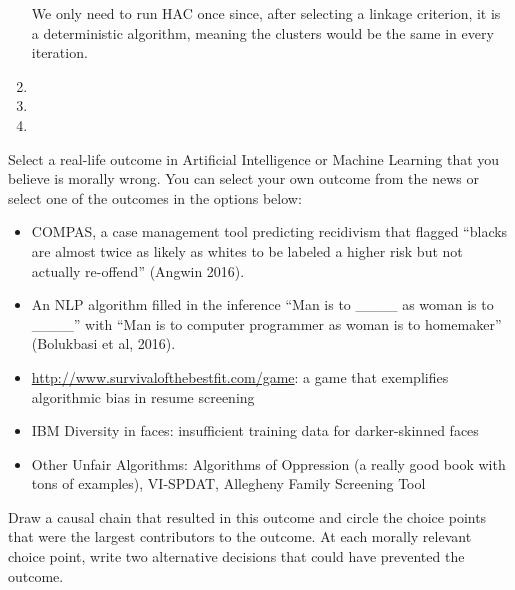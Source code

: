 \documentclass[submit]{harvardml}
\begin{document}
\begin{enumerate}
	We only need to run HAC once since, after selecting a linkage criterion, it is a deterministic algorithm, meaning the clusters would be the same in every iteration.

	\item 
	\item
	\item
\end{enumerate}

\newpage

\begin{problem}

Select a real-life outcome in Artificial Intelligence or Machine Learning 
that you believe is morally wrong. You can select your own outcome from 
the news or select one of the outcomes in the options below:

\begin{itemize}
    \item COMPAS, a case management tool predicting recidivism that 
        flagged “blacks are almost twice as likely as whites to be 
        labeled a higher risk but not actually re-offend” (Angwin 
        2016).
        
    \item An NLP algorithm filled in the inference “Man is to 
        \_\_\_\_ as woman is to \_\_\_\_” with “Man is 
        to computer programmer as woman is to homemaker” (Bolukbasi 
        et al, 2016).
        
    \item \url{http://www.survivalofthebestfit.com/game}: a game that 
        exemplifies algorithmic bias in resume screening
        
    \item IBM Diversity in faces: insufficient training data for 
        darker-skinned faces
        
    \item Other Unfair Algorithms: Algorithms of Oppression (a really 
        good book with tons of examples), VI-SPDAT, Allegheny Family 
        Screening Tool
        
\end{itemize}
Draw a causal chain that resulted in this outcome and circle the choice points that were the largest contributors to the outcome. At each morally relevant choice point, write two alternative decisions that could have prevented the outcome.

\end{problem}
\end{document}
